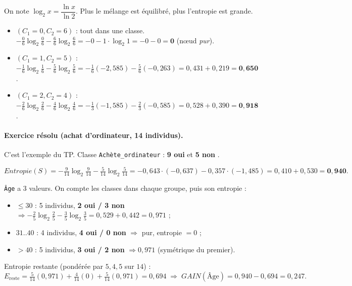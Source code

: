 \begin{Calcul}
On note $\log_2 x=\dfrac{\ln x}{\ln 2}$. Plus le mélange est équilibré, plus l'entropie est grande.
\begin{itemize}[nosep,leftmargin=1.4em]
  \item $(C_1{=}0,C_2{=}6)$ : tout dans une classe.
        $-\tfrac06\log_2\tfrac06-\tfrac66\log_2\tfrac66=-0-1\cdot\log_2 1=-0-0=\mathbf{0}$
        (nœud \emph{pur}).
  \item $(C_1{=}1,C_2{=}5)$ : $-\tfrac16\log_2\tfrac16-\tfrac56\log_2\tfrac56
        =-\tfrac16(-2{,}585)-\tfrac56(-0{,}263)=0{,}431+0{,}219=\mathbf{0{,}650}$.
  \item $(C_1{=}2,C_2{=}4)$ : $-\tfrac26\log_2\tfrac26-\tfrac46\log_2\tfrac46
        =-\tfrac13(-1{,}585)-\tfrac23(-0{,}585)=0{,}528+0{,}390=\mathbf{0{,}918}$.
\end{itemize}
\end{Calcul}

\paragraph{Exercice résolu (achat d'ordinateur, 14 individus).} C'est l'exemple du TP.
Classe \texttt{Achète\_ordinateur} : \textbf{9 \og oui \fg{}} et \textbf{5 \og non \fg{}}.

\begin{Calcul}
\[ Entropie(S)=-\tfrac{9}{14}\log_2\tfrac{9}{14}-\tfrac{5}{14}\log_2\tfrac{5}{14}
   =-0{,}643\cdot(-0{,}637)-0{,}357\cdot(-1{,}485)=0{,}410+0{,}530=\mathbf{0{,}940}. \]
\end{Calcul}

\begin{Calcul}
\texttt{Âge} a 3 valeurs. On compte les classes dans chaque groupe, puis son entropie :
\begin{itemize}[nosep,leftmargin=1.4em]
  \item $\le 30$ : 5 individus, \textbf{2 oui / 3 non} $\Rightarrow
        -\tfrac25\log_2\tfrac25-\tfrac35\log_2\tfrac35=0{,}529+0{,}442=0{,}971$ ;
  \item $31..40$ : 4 individus, \textbf{4 oui / 0 non} $\Rightarrow$ pur, entropie $=0$ ;
  \item $>40$ : 5 individus, \textbf{3 oui / 2 non} $\Rightarrow 0{,}971$ (symétrique du premier).
\end{itemize}
Entropie restante (pondérée par $5,4,5$ sur $14$) :
\[ E_{\text{reste}}=\tfrac{5}{14}(0{,}971)+\tfrac{4}{14}(0)+\tfrac{5}{14}(0{,}971)=0{,}694
   \;\Rightarrow\; \boxed{GAIN(\text{Âge})=0{,}940-0{,}694=0{,}247}. \]
\end{Calcul}

